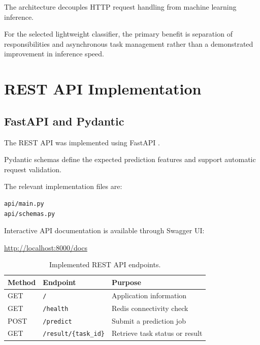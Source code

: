 \documentclass[11pt,a4paper]{article}
\begin{document}
The architecture decouples HTTP request handling from
machine learning inference.

For the selected lightweight classifier, the primary
benefit is separation of responsibilities and
asynchronous task management rather than a demonstrated
improvement in inference speed.


\section{REST API Implementation}

\subsection{FastAPI and Pydantic}

The REST API was implemented using FastAPI
\cite{fastapi}.

Pydantic schemas define the expected prediction features
and support automatic request validation.

The relevant implementation files are:

\begin{lstlisting}
api/main.py
api/schemas.py
\end{lstlisting}

Interactive API documentation is available through
Swagger UI:

\begin{center}
\url{http://localhost:8000/docs}
\end{center}

\begin{table}[H]
\centering
\begin{tabularx}{\linewidth}{@{}llX@{}}
\toprule
\textbf{Method} & \textbf{Endpoint} & \textbf{Purpose}\\
\midrule
GET & \texttt{/} & Application information\\
GET & \texttt{/health} & Redis connectivity check\\
POST & \texttt{/predict} & Submit a prediction job\\
GET & \texttt{/result/\{task\_id\}} & Retrieve task status or result\\
\bottomrule
\end{tabularx}
\caption{Implemented REST API endpoints.}
\end{table}
\end{document}
